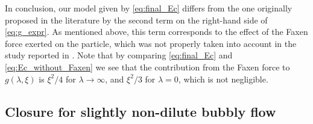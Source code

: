 In conclusion, our model given by \eqref{eq:final_Ec} differs from the one originally proposed in the literature by the second term on the right-hand side of \eqref{eq:g_expr}.
As mentioned above, this term corresponds to the effect of the Faxen force exerted on the particle, which was not properly taken into account in the study reported in \citep{loewenberg1994flotation}. 
Note that by comparing \eqref{eq:final_Ec} and \eqref{eq:Ec_without_Faxen} we see that the contribution from the Faxen force to $g(\lambda,\xi)$ is $\xi^2 /4$ for $\lambda \to \infty$,  and  $\xi^2/3$ for $\lambda=0$, which is  not negligible. 
 





\subsection{Closure for slightly non-dilute bubbly flow}

